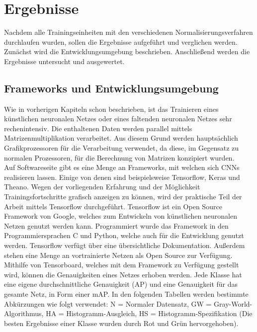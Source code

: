 \chapter{Ergebnisse}\label{s.ergebnisse}
Nachdem alle Trainingseinheiten mit den verschiedenen Normalisierungsverfahren durchlaufen wurden, sollen die Ergebnisse aufgeführt und verglichen werden. Zunächst wird die Entwicklungsumgebung beschrieben. Anschließend werden die Ergebnisse untersucht und ausgewertet. 
\section{Frameworks und Entwicklungsumgebung}\label{s.entwicklung}
Wie in vorherigen Kapiteln schon beschrieben, ist das Trainieren eines künstlichen neuronalen Netzes oder eines faltenden neuronalen Netzes sehr rechenintensiv. Die enthaltenen Daten werden parallel mittels Matrizenmultiplikation verarbeitet. Aus diesem Grund werden hauptsächlich Grafikprozessoren für die Verarbeitung verwendet, da diese, im Gegensatz zu normalen Prozessoren, für die Berechnung von Matrizen konzipiert wurden.\\
Auf Softwareseite gibt es eine Menge an Frameworks, mit welchen sich CNNs realisieren lassen. Einige von denen sind beispielsweise Tensorflow, Keras und Theano. Wegen der vorliegenden Erfahrung und der Möglichkeit Trainingsfortschritte grafisch anzeigen zu können, wird der praktische Teil der Arbeit mittels Tensorflow durchgeführt. Tensorflow ist ein Open Source Framework von Google, welches zum Entwickeln von künstlichen neuronalen Netzen genutzt werden kann. Programmiert wurde das Framework in den Programmiersprachen C und Python, welche auch für die Entwicklung genutzt werden. Tensorflow verfügt über eine übersichtliche Dokumentation. Außerdem stehen eine Menge an vortrainierte Netzen als Open Source zur Verfügung. Mithilfe von Tensorboard, welches mit dem Framework zu Verfügung gestellt wird, können die Genauigkeiten eines Netzes erhoben werden. Jede Klasse hat eine eigene durchschnittliche Genauigkeit (AP) und eine Genauigkeit für das gesamte Netz, in Form einer mAP. In den folgenden Tabellen werden bestimmte Abkürzungen wie folgt verwendet: N = Normaler Datensatz, GW = Gray-World-Algorithmus, HA = Histogramm-Ausgleich, HS = Histogramm-Spezifikation (Die besten Ergebnisse einer Klasse wurden durch Rot und Grün hervorgehoben).  
